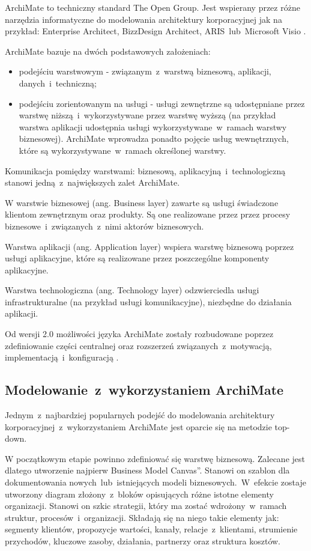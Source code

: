 ArchiMate to techniczny standard The Open Group. Jest wspierany przez różne narzędzia informatyczne do modelowania architektury korporacyjnej jak na przykład: Enterprise Architect, BizzDesign Architect, ARIS~lub~Microsoft Visio \cite{OpenGrArch}.

ArchiMate bazuje na dwóch podstawowych założeniach:
\begin{itemize}
\item{podejściu warstwowym - związanym~z~warstwą biznesową, aplikacji, danych~i~techniczną;}
\item{podejściu zorientowanym na usługi - usługi zewnętrzne są udostępniane przez warstwę niższą~i~wykorzystywane przez warstwę wyższą (na przykład warstwa aplikacji udostępnia usługi wykorzystywane~w~ramach warstwy biznesowej). ArchiMate wprowadza ponadto pojęcie usług wewnętrznych, które są wykorzystywane~w~ramach określonej warstwy.}
\end{itemize}

Komunikacja pomiędzy warstwami: biznesową, aplikacyjną~i~technologiczną stanowi jedną~z~największych zalet ArchiMate.

W warstwie biznesowej (ang. Business layer) zawarte są usługi świadczone klientom zewnętrznym oraz produkty. Są one realizowane przez przez procesy biznesowe~i~związanych~z~nimi aktorów biznesowych.

Warstwa aplikacji (ang. Application layer) wspiera warstwę biznesową poprzez usługi aplikacyjne, które są realizowane przez poszczególne komponenty aplikacyjne.

Warstwa technologiczna (ang. Technology layer) odzwierciedla usługi infrastrukturalne (na przykład usługi komunikacyjne), niezbędne do działania aplikacji.

Od wersji 2.0 możliwości języka ArchiMate zostały rozbudowane poprzez zdefiniowanie części centralnej oraz rozszerzeń związanych~z~motywacją, implementacją~i~konfiguracją \cite{ArchKorpSob}.

\subsection{Modelowanie~z~wykorzystaniem ArchiMate}
Jednym~z~najbardziej popularnych podejść do modelowania architektury korporacyjnej~z~wykorzystaniem ArchiMate jest oparcie się na metodzie top-down. 

W początkowym etapie powinno zdefiniować się warstwę biznesową. Zalecane jest dlatego utworzenie najpierw \quotedblbase Business Model Canvas\textquotedblright. Stanowi on szablon dla dokumentowania nowych~lub~istniejących modeli biznesowych.~W~efekcie zostaje utworzony diagram złożony~z~bloków opisujących różne istotne elementy organizacji. Stanowi on szkic strategii, który ma zostać wdrożony~w~ramach struktur, procesów~i~organizacji. Składają się na niego takie elementy jak: segmenty klientów, propozycje wartości, kanały, relacje~z~klientami, strumienie przychodów, kluczowe zasoby, działania, partnerzy oraz struktura kosztów. 

